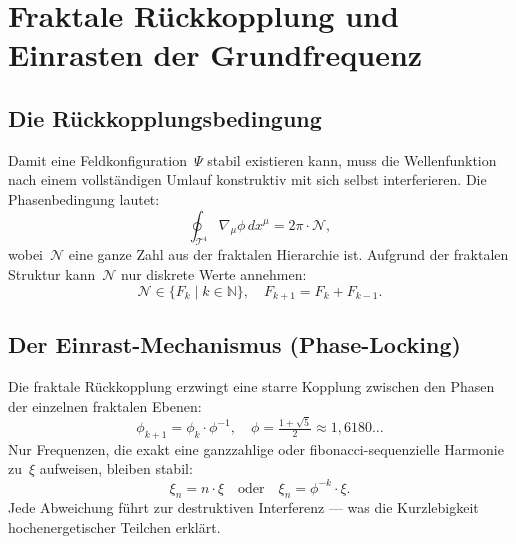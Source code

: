 \section{Fraktale Rückkopplung und Einrasten der Grundfrequenz}

\subsection{Die Rückkopplungsbedingung}

Damit eine Feldkonfiguration~$\Psi$ stabil existieren kann, muss die
Wellenfunktion nach einem vollständigen Umlauf konstruktiv mit sich selbst
interferieren. Die Phasenbedingung lautet:
\begin{equation}
  \oint_{\mathcal{T}^4} \nabla_{\mu}\phi\,dx^\mu = 2\pi\cdot\mathcal{N},
\end{equation}
wobei~$\mathcal{N}$ eine ganze Zahl aus der fraktalen Hierarchie ist.
Aufgrund der fraktalen Struktur kann~$\mathcal{N}$ nur diskrete Werte
annehmen:
\begin{equation}
  \mathcal{N} \in \{F_k \mid k \in \mathbb{N}\},\quad
  F_{k+1} = F_k + F_{k-1}.
\end{equation}

\subsection{Der Einrast-Mechanismus (Phase-Locking)}

Die fraktale Rückkopplung erzwingt eine starre Kopplung zwischen den
Phasen der einzelnen fraktalen Ebenen:
\begin{equation}
  \phi_{k+1} = \phi_k \cdot \phi^{-1}, \quad
  \phi = \tfrac{1+\sqrt{5}}{2} \approx 1{,}6180\ldots
\end{equation}
Nur Frequenzen, die exakt eine ganzzahlige oder fibonacci-sequenzielle
Harmonie zu~$\xi$ aufweisen, bleiben stabil:
\begin{equation}
  \xi_n = n \cdot \xi \quad \text{oder} \quad \xi_n = \phi^{-k}\cdot\xi.
\end{equation}
Jede Abweichung führt zur destruktiven Interferenz — was die Kurzlebigkeit
hochenergetischer Teilchen erklärt.

